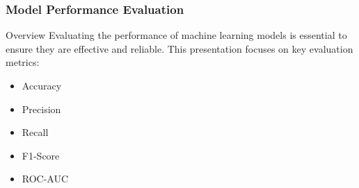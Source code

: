 \documentclass[aspectratio=169]{beamer}
\begin{document}
\begin{frame}[fragile]
    \frametitle{Model Performance Evaluation}
    \begin{block}{Overview}
        Evaluating the performance of machine learning models is essential to ensure they are effective and reliable. This presentation focuses on key evaluation metrics:
        \begin{itemize}
            \item Accuracy
            \item Precision
            \item Recall
            \item F1-Score
            \item ROC-AUC
        \end{itemize}
    \end{block}
\end{frame}
\end{document}
